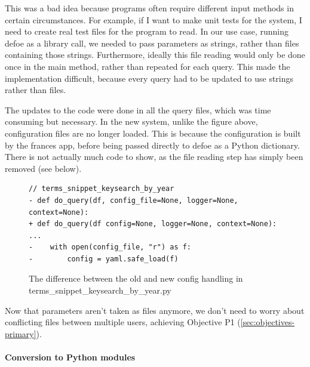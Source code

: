 \documentclass[12pt, letterpaper]{article}
\begin{document}
\begin{flushleft}
This was a bad idea because programs often require different input methods in certain circumstances. For example, if I want to make unit tests for the system, I need to create real test files for the program to read. In our use case, running defoe as a library call, we needed to pass parameters as strings, rather than files containing those strings. Furthermore, ideally this file reading would only be done once in the main method, rather than repeated for each query. This made the implementation difficult, because every query had to be updated to use strings rather than files.
\end{flushleft}

\begin{flushleft}
The updates to the code were done in all the query files, which was time consuming but necessary. In the new system, unlike the figure above, configuration files are no longer loaded. This is because the configuration is built by the frances app, before being passed directly to defoe as a Python dictionary. There is not actually much code to show, as the file reading step has simply been removed (see below).
\end{flushleft}

\begin{flushleft}
\begin{figure}[H]
\begin{verbatim}
// terms_snippet_keysearch_by_year
- def do_query(df, config_file=None, logger=None, context=None):
+ def do_query(df config=None, logger=None, context=None):
...
-    with open(config_file, "r") as f:
-        config = yaml.safe_load(f)
\end{verbatim}
\caption{The difference between the old and new config handling in terms\_snippet\_keysearch\_by\_year.py}
\end{figure}
\end{flushleft}

\begin{flushleft}
Now that parameters aren't taken as files anymore, we don't need to worry about conflicting files between multiple users, achieving Objective P1 (\ref{sec:objectives-primary}).
\end{flushleft}

\paragraph{Conversion to Python modules}
\label{sec:convert-to-modules}
\end{document}
